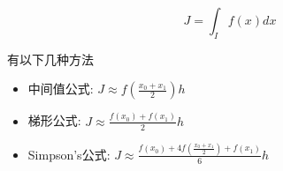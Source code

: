 \documentclass{article}
\begin{document}
\begin{equation*}
    J = \int_I f(x) dx
\end{equation*}

有以下几种方法
\begin{itemize}
\item 中间值公式: $ J \approx f(\frac{x_{0}+x_{1}}{2})h $
\item 梯形公式: $ J \approx \frac{f(x_0)+f(x_1)}{2}h $
\item Simpson's公式: $ J \approx \frac{f(x_0)+4f(\frac{x_{0}+x_{1}}{2})+f(x_1)}{6}h $
\end{itemize}

%
%
\end{document}
